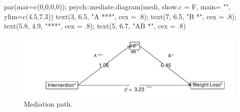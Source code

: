 \documentclass[
]{article}
\newenvironment{Shaded}{\begin{snugshade}}{\end{snugshade}}
\newcommand{\AttributeTok}[1]{\textcolor[rgb]{0.77,0.63,0.00}{#1}}
\newcommand{\DecValTok}[1]{\textcolor[rgb]{0.00,0.00,0.81}{#1}}
\newcommand{\FloatTok}[1]{\textcolor[rgb]{0.00,0.00,0.81}{#1}}
\newcommand{\FunctionTok}[1]{\textcolor[rgb]{0.00,0.00,0.00}{#1}}
\newcommand{\NormalTok}[1]{#1}
\newcommand{\SpecialCharTok}[1]{\textcolor[rgb]{0.00,0.00,0.00}{#1}}
\newcommand{\StringTok}[1]{\textcolor[rgb]{0.31,0.60,0.02}{#1}}
\begin{document}
\begin{Shaded}
\begin{Highlighting}[]
\FunctionTok{par}\NormalTok{(}\AttributeTok{mar=}\FunctionTok{c}\NormalTok{(}\DecValTok{0}\NormalTok{,}\DecValTok{0}\NormalTok{,}\DecValTok{0}\NormalTok{,}\DecValTok{0}\NormalTok{)); psych}\SpecialCharTok{::}\FunctionTok{mediate.diagram}\NormalTok{(medi, }\AttributeTok{show.c =}\NormalTok{ F, }\AttributeTok{main=} \StringTok{""}\NormalTok{, }\AttributeTok{ylim=}\FunctionTok{c}\NormalTok{(}\FloatTok{4.5}\NormalTok{,}\FloatTok{7.3}\NormalTok{))}
\FunctionTok{text}\NormalTok{(}\DecValTok{3}\NormalTok{, }\FloatTok{6.5}\NormalTok{, }\StringTok{"A ***"}\NormalTok{,  }\AttributeTok{cex =}\NormalTok{ .}\DecValTok{8}\NormalTok{); }\FunctionTok{text}\NormalTok{(}\DecValTok{7}\NormalTok{, }\FloatTok{6.5}\NormalTok{, }\StringTok{"B *"}\NormalTok{,  }\AttributeTok{cex =}\NormalTok{ .}\DecValTok{8}\NormalTok{);  }\FunctionTok{text}\NormalTok{(}\FloatTok{5.8}\NormalTok{, }\FloatTok{4.9}\NormalTok{, }\StringTok{"***"}\NormalTok{,  }\AttributeTok{cex =}\NormalTok{ .}\DecValTok{8}\NormalTok{); }\FunctionTok{text}\NormalTok{(}\DecValTok{5}\NormalTok{, }\FloatTok{6.7}\NormalTok{, }\StringTok{"AB *"}\NormalTok{,  }\AttributeTok{cex =}\NormalTok{ .}\DecValTok{8}\NormalTok{)}
\end{Highlighting}
\end{Shaded}

\begin{figure}

{\centering \includegraphics{OBIWAN_LIRA_files/figure-latex/unnamed-chunk-9-1} 

}

\caption{Mediation path.}\label{fig:unnamed-chunk-9}
\end{figure}

\hfill\break
\end{document}
